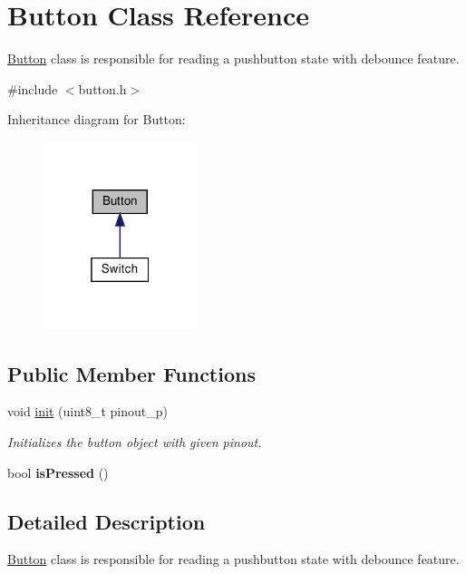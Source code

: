 \hypertarget{class_button}{}\section{Button Class Reference}
\label{class_button}


\hyperlink{class_button}{Button} class is responsible for reading a pushbutton state with debounce feature.  




{\ttfamily \#include $<$button.\+h$>$}



Inheritance diagram for Button\+:
\nopagebreak
\begin{figure}[H]
\begin{center}
\leavevmode
\includegraphics[width=127pt]{class_button__inherit__graph}
\end{center}
\end{figure}
\subsection*{Public Member Functions}
\begin{DoxyCompactItemize}
\item 
void \hyperlink{class_button_a5768906065b7f1d4d146f1d9fc5ce890}{init} (uint8\+\_\+t pinout\+\_\+p)
\begin{DoxyCompactList}\small\item\em Initializes the button object with given pinout. \end{DoxyCompactList}\item 
\mbox{\label{class_button_a143f0a274b03d2bede8a84e37cd43dc7}} 
bool {\bfseries is\+Pressed} ()
\end{DoxyCompactItemize}


\subsection{Detailed Description}
\hyperlink{class_button}{Button} class is responsible for reading a pushbutton state with debounce feature. 

